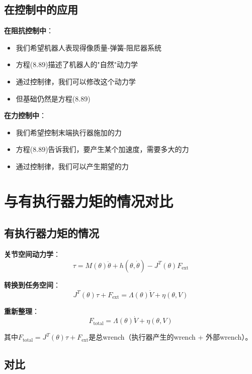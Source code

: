 \documentclass[12pt,a4paper]{article}
\begin{document}
\subsection{在控制中的应用}

\textbf{在阻抗控制中}：
\begin{itemize}
\item 我们希望机器人表现得像质量-弹簧-阻尼器系统
\item 方程(8.89)描述了机器人的"自然"动力学
\item 通过控制律，我们可以修改这个动力学
\item 但基础仍然是方程(8.89)
\end{itemize}

\textbf{在力控制中}：
\begin{itemize}
\item 我们希望控制末端执行器施加的力
\item 方程(8.89)告诉我们，要产生某个加速度，需要多大的力
\item 通过控制律，我们可以产生期望的力
\end{itemize}

\section{与有执行器力矩的情况对比}

\subsection{有执行器力矩的情况}

\textbf{关节空间动力学}：
\begin{equation}
\tau = M(\theta)\ddot{\theta} + h(\theta, \dot{\theta}) - J^T(\theta)F_{\text{ext}} \tag{8.82-full}
\end{equation}

\textbf{转换到任务空间}：
\begin{equation}
J^T(\theta)\tau + F_{\text{ext}} = \Lambda(\theta)\dot{V} + \eta(\theta, V)
\end{equation}

\textbf{重新整理}：
\begin{equation}
F_{\text{total}} = \Lambda(\theta)\dot{V} + \eta(\theta, V)
\end{equation}

其中$F_{\text{total}} = J^T(\theta)\tau + F_{\text{ext}}$是总wrench（执行器产生的wrench + 外部wrench）。

\subsection{对比}
\end{document}
